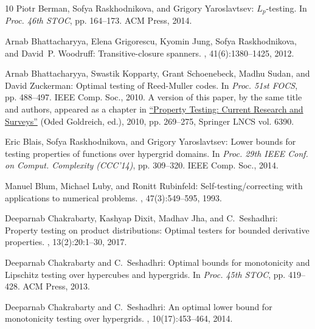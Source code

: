 \documentclass[11pt]{article}
\numberwithin{equation}{section}
\theoremstyle{definition}
\theoremstyle{plain}
\begin{document}
\begin{thebibliography}{10}
{\sc Piotr Berman, Sofya Raskhodnikova, and Grigory Yaroslavtsev}:
  {$L_p$}-testing.
\newblock In {\em Proc. 46th STOC}, pp. 164--173. ACM Press, 2014.
\newblock [\epfmtdoi{10.1145/2591796.2591887}]

{\sc Arnab Bhattacharyya, Elena Grigorescu, Kyomin Jung, Sofya Raskhodnikova,
  and David~P. Woodruff}: Transitive-closure spanners.
, 41(6):1380--1425, 2012.
\newblock [\epfmtdoi{10.1137/110826655}]

{\sc Arnab Bhattacharyya, Swastik Kopparty, Grant Schoenebeck, Madhu Sudan, and
  David Zuckerman}: Optimal testing of {Reed-Muller} codes.
\newblock In {\em Proc. 51st FOCS}, pp. 488--497. IEEE Comp. Soc., 2010.
\newblock A version of this paper, by the same title and authors, appeared as a
  chapter in \href{https://doi.org/10.1007/978-3-642-16367-8\_19}{ ``Property
  Testing: Current Research and Surveys''} (Oded Goldreich, ed.), 2010, pp.
  269--275, Springer LNCS vol. 6390.

{\sc Eric Blais, Sofya Raskhodnikova, and Grigory Yaroslavtsev}: Lower bounds
  for testing properties of functions over hypergrid domains.
\newblock In {\em Proc. 29th IEEE Conf. on Comput. Complexity (CCC'14)}, pp.
  309--320. IEEE Comp. Soc., 2014.

{\sc Manuel Blum, Michael Luby, and Ronitt Rubinfeld}: Self-testing/correcting
  with applications to numerical problems.
, 47(3):549--595, 1993.
\newblock [\epfmtdoi{10.1016/0022-0000(93)90044-W}]

{\sc Deeparnab Chakrabarty, Kashyap Dixit, Madhav Jha, and C.~Seshadhri}:
  Property testing on product distributions: Optimal testers for bounded
  derivative properties.
, 13(2):20:1--30, 2017.
\newblock [\epfmtdoi{10.1145/3039241}]

{\sc Deeparnab Chakrabarty and C.~Seshadhri}: Optimal bounds for monotonicity
  and {Lipschitz} testing over hypercubes and hypergrids.
\newblock In {\em Proc. 45th STOC}, pp. 419--428. ACM Press, 2013.
\newblock [\epfmtdoi{10.1145/2488608.2488661}]

{\sc Deeparnab Chakrabarty and C.~Seshadhri}: An optimal lower bound for
  monotonicity testing over hypergrids.
, 10(17):453--464, 2014.


\end{thebibliography}
\end{document}
